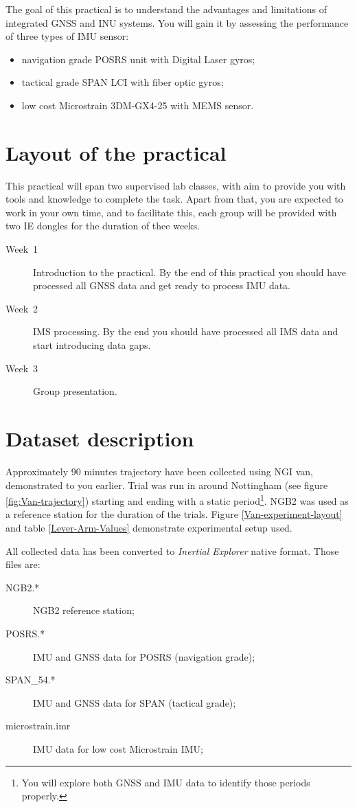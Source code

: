 \documentclass[11pt,fleqn]{book} %
\begin{document}
The goal of this practical is to understand the advantages and limitations of integrated GNSS and INU systems. You will gain it by assessing the performance of three types of IMU sensor:

\begin{itemize}
	\item navigation grade POSRS unit with Digital Laser gyros;
	\item tactical grade SPAN LCI with fiber optic gyros;
	\item low cost Microstrain 3DM-GX4-25 with MEMS sensor.
\end{itemize}


\section{Layout of the practical}

This practical will span two supervised lab classes, with aim to provide you with tools and knowledge to complete the task. Apart from that, you are expected to work in your own time, and to facilitate this, each group will be provided with two IE dongles for the duration of thee weeks.

\begin{description}
	\item [{Week~1}] Introduction to the practical. By the end of this practical you should
	have processed all GNSS data and get ready to process IMU data.
	\item [{Week~2}] IMS processing. By the end you should have processed
	all IMS data and start introducing data gaps.
	\item [{Week~3}] Group presentation.
\end{description}

\section{Dataset description}

Approximately 90 minutes trajectory have been collected using NGI van, demonstrated to you earlier. Trial was run in around Nottingham (see figure \ref{fig:Van-trajectory}) starting and ending with a static period\footnote{You will explore both GNSS and IMU data to identify those periods properly.}. NGB2 was used as a reference station for the duration of the trials.
Figure \ref{Van-experiment-layout} and table \ref{Lever-Arm-Values} demonstrate experimental setup used.

All collected data has been converted to \emph{Inertial Explorer} native format. Those files are:
	\begin{description}
	\item [{NGB2.{*}}] NGB2 reference station;
	\item [{POSRS.{*}}] IMU and GNSS data for POSRS (navigation grade);
	\item [{SPAN\_54.{*}}] IMU and GNSS data for SPAN (tactical grade);
	\item [{microstrain.imr}] IMU data for low cost Microstrain IMU;
	\end{description}
\end{document}

